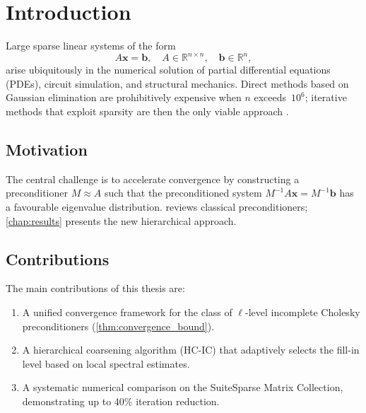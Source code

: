 \documentclass[
    12pt,
    a4paper,
    twoside,           %
    openright          %
]{book}
\newcommand{\R}{\mathbb{R}}           %
\begin{document}

\mainmatter


\chapter{Introduction}
\label{chap:intro}

Large sparse linear systems of the form
\begin{equation}
    \label{eq:linear_system}
    A\mathbf{x} = \mathbf{b}, \quad A \in \R^{n \times n}, \quad
    \mathbf{b} \in \R^{n},
\end{equation}
arise ubiquitously in the numerical solution of partial differential
equations (PDEs), circuit simulation, and structural mechanics.  Direct
methods based on Gaussian elimination are prohibitively expensive when $n$
exceeds~$10^6$; iterative methods that exploit sparsity are then the only
viable approach \cite{saad2003iterative}.

\section{Motivation}
\label{sec:intro_motivation}

The central challenge is to accelerate convergence by constructing a
preconditioner $M \approx A$ such that the preconditioned system
$M^{-1}A\mathbf{x} = M^{-1}\mathbf{b}$ has a favourable eigenvalue
distribution.   reviews classical preconditioners;
\cref{chap:results} presents the new hierarchical approach.

\section{Contributions}
\label{sec:intro_contributions}

The main contributions of this thesis are:
\begin{enumerate}
    \item A unified convergence framework for the class of $\ell$-level
          incomplete Cholesky preconditioners (\cref{thm:convergence_bound}).
    \item A hierarchical coarsening algorithm (HC-IC) that adaptively selects
          the fill-in level based on local spectral estimates.
    \item A systematic numerical comparison on the SuiteSparse Matrix
          Collection, demonstrating up to 40\% iteration reduction.
\end{enumerate}
\end{document}
